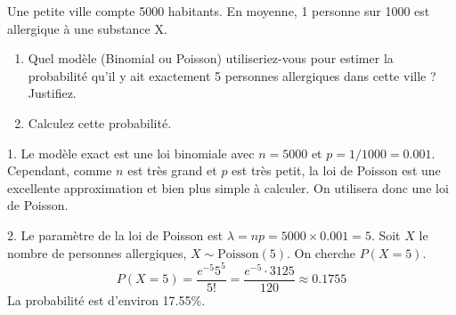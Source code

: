 \begin{exercicebox}
Une petite ville compte 5000 habitants. En moyenne, 1 personne sur 1000 est allergique à une substance X.
\begin{enumerate}
    \item Quel modèle (Binomial ou Poisson) utiliseriez-vous pour estimer la probabilité qu'il y ait exactement 5 personnes allergiques dans cette ville ? Justifiez.
    \item Calculez cette probabilité.
\end{enumerate}
\end{exercicebox}

\begin{correctionbox}
1. Le modèle exact est une loi binomiale avec $n=5000$ et $p=1/1000=0.001$. Cependant, comme $n$ est très grand et $p$ est très petit, la loi de Poisson est une excellente approximation et bien plus simple à calculer. On utilisera donc une loi de Poisson.

2. Le paramètre de la loi de Poisson est $\lambda = np = 5000 \times 0.001 = 5$.
Soit $X$ le nombre de personnes allergiques, $X \sim \text{Poisson}(5)$.
On cherche $P(X=5)$.
$$ P(X=5) = \frac{e^{-5} 5^5}{5!} = \frac{e^{-5} \cdot 3125}{120} \approx 0.1755 $$
La probabilité est d'environ 17.55\%.
\end{correctionbox}